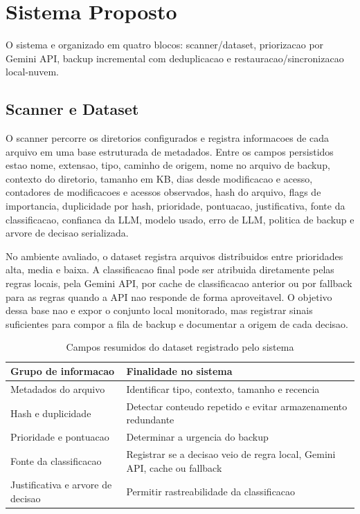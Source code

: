 \documentclass[12pt,a4paper]{article}
\begin{document}
\section{Sistema Proposto}

O sistema e organizado em quatro blocos: scanner/dataset, priorizacao por Gemini API, backup incremental com deduplicacao e restauracao/sincronizacao local-nuvem.

\subsection{Scanner e Dataset}

O scanner percorre os diretorios configurados e registra informacoes de cada arquivo em uma base estruturada de metadados. Entre os campos persistidos estao nome, extensao, tipo, caminho de origem, nome no arquivo de backup, contexto do diretorio, tamanho em KB, dias desde modificacao e acesso, contadores de modificacoes e acessos observados, hash do arquivo, flags de importancia, duplicidade por hash, prioridade, pontuacao, justificativa, fonte da classificacao, confianca da LLM, modelo usado, erro de LLM, politica de backup e arvore de decisao serializada.

No ambiente avaliado, o dataset registra arquivos distribuidos entre prioridades alta, media e baixa. A classificacao final pode ser atribuida diretamente pelas regras locais, pela Gemini API, por cache de classificacao anterior ou por fallback para as regras quando a API nao responde de forma aproveitavel. O objetivo dessa base nao e expor o conjunto local monitorado, mas registrar sinais suficientes para compor a fila de backup e documentar a origem de cada decisao.

\begin{table}[h]
\centering
\caption{Campos resumidos do dataset registrado pelo sistema}
\begin{tabular}{L{0.42\textwidth}L{0.42\textwidth}}
\toprule
Grupo de informacao & Finalidade no sistema \\
\midrule
Metadados do arquivo & Identificar tipo, contexto, tamanho e recencia \\
Hash e duplicidade & Detectar conteudo repetido e evitar armazenamento redundante \\
Prioridade e pontuacao & Determinar a urgencia do backup \\
Fonte da classificacao & Registrar se a decisao veio de regra local, Gemini API, cache ou fallback \\
Justificativa e arvore de decisao & Permitir rastreabilidade da classificacao \\
\bottomrule
\end{tabular}
\end{table}
\end{document}
